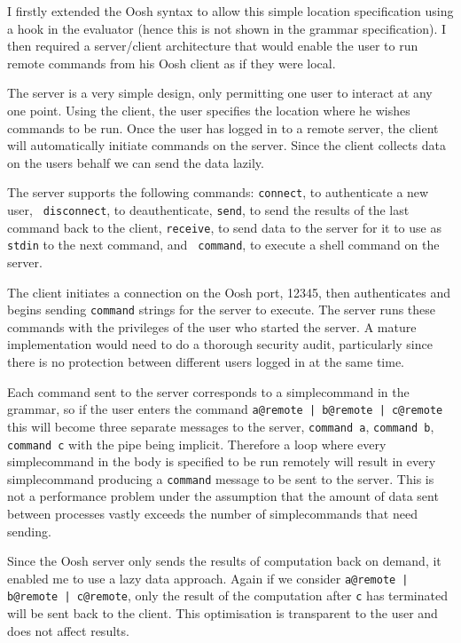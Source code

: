 \documentclass[12pt,twoside,notitlepage]{report}
\begin{document}
I firstly extended the Oosh syntax to allow this simple location
specification using a hook in the evaluator (hence this is not shown
in the grammar specification). I then required a server/client
architecture that would enable the user to run remote commands from
his Oosh client as if they were local.

The server is a very simple design, only permitting one user to interact at any
one point. Using the client, the user specifies the location where he wishes
commands to be run. Once the user has logged in to a remote server, the client
will automatically initiate commands on the server. Since the client collects
data on the users behalf we can send the data lazily.

The server supports the following commands: {\tt connect}, to
authenticate a new user, {\tt
  disconnect}, to deauthenticate, {\tt send}, to send the results of
the last command back to the client, {\tt receive}, to send data to
the server for it to use as {\tt stdin} to the next command, and {\tt
  command}, to execute a shell command on the server. 

The client initiates a connection on the Oosh port, 12345, then
authenticates and begins sending {\tt command} strings for the server
to execute. The server runs these commands with the privileges of the
user who started the server. A mature implementation would need to do
a thorough security audit, particularly since there is no protection
between different users logged in at the same time. 

Each command sent to the server corresponds to a simplecommand in the
grammar, so if the user enters the command {\tt a@remote | b@remote |
  c@remote} this will become three separate messages to the server,
{\tt command a}, {\tt command b}, {\tt command c} with the pipe being
implicit. Therefore a loop where every simplecommand in the body is
specified to be run remotely will result in every simplecommand
producing a {\tt command} message to be sent to the server. This is
not a performance problem under the assumption that the amount of data
sent between processes vastly exceeds the number of simplecommands
that need sending.

Since the Oosh server only sends the results of computation back on
demand, it enabled me to use a lazy data approach. Again if we
consider {\tt a@remote | b@remote | c@remote}, only the result of the
computation after {\tt c} has terminated will be sent back to the
client. This optimisation is transparent to the user and does not
affect results.
\end{document}
